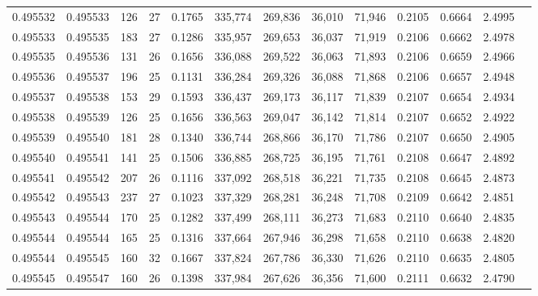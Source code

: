 \begin{tabular}{rrrrrrrrrrrrr}
0.495532 & 0.495533 & 126 &  27 &                                     0.1765 & 335,774 & 269,836 &  36,010 &  71,946 & 0.2105 & 0.6664 & 2.4995 \\
0.495533 & 0.495535 & 183 &  27 &                                     0.1286 & 335,957 & 269,653 &  36,037 &  71,919 & 0.2106 & 0.6662 & 2.4978 \\
0.495535 & 0.495536 & 131 &  26 &                                     0.1656 & 336,088 & 269,522 &  36,063 &  71,893 & 0.2106 & 0.6659 & 2.4966 \\
0.495536 & 0.495537 & 196 &  25 &                                     0.1131 & 336,284 & 269,326 &  36,088 &  71,868 & 0.2106 & 0.6657 & 2.4948 \\
0.495537 & 0.495538 & 153 &  29 &                                     0.1593 & 336,437 & 269,173 &  36,117 &  71,839 & 0.2107 & 0.6654 & 2.4934 \\
0.495538 & 0.495539 & 126 &  25 &                                     0.1656 & 336,563 & 269,047 &  36,142 &  71,814 & 0.2107 & 0.6652 & 2.4922 \\
0.495539 & 0.495540 & 181 &  28 &                                     0.1340 & 336,744 & 268,866 &  36,170 &  71,786 & 0.2107 & 0.6650 & 2.4905 \\
0.495540 & 0.495541 & 141 &  25 &                                     0.1506 & 336,885 & 268,725 &  36,195 &  71,761 & 0.2108 & 0.6647 & 2.4892 \\
0.495541 & 0.495542 & 207 &  26 &                                     0.1116 & 337,092 & 268,518 &  36,221 &  71,735 & 0.2108 & 0.6645 & 2.4873 \\
0.495542 & 0.495543 & 237 &  27 &                                     0.1023 & 337,329 & 268,281 &  36,248 &  71,708 & 0.2109 & 0.6642 & 2.4851 \\
0.495543 & 0.495544 & 170 &  25 &                                     0.1282 & 337,499 & 268,111 &  36,273 &  71,683 & 0.2110 & 0.6640 & 2.4835 \\
0.495544 & 0.495544 & 165 &  25 &                                     0.1316 & 337,664 & 267,946 &  36,298 &  71,658 & 0.2110 & 0.6638 & 2.4820 \\
0.495544 & 0.495545 & 160 &  32 &                                     0.1667 & 337,824 & 267,786 &  36,330 &  71,626 & 0.2110 & 0.6635 & 2.4805 \\
0.495545 & 0.495547 & 160 &  26 &                                     0.1398 & 337,984 & 267,626 &  36,356 &  71,600 & 0.2111 & 0.6632 & 2.4790 \\

\end{tabular}
